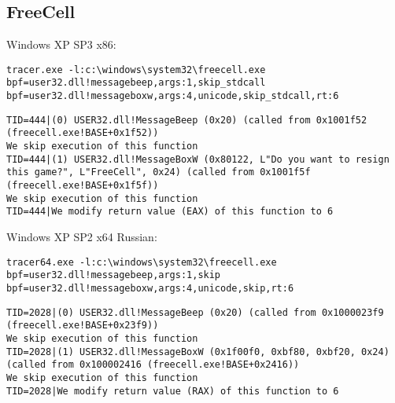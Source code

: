 \subsection{FreeCell}



 Windows XP SP3 x86:

\begin{lstlisting}
tracer.exe -l:c:\windows\system32\freecell.exe bpf=user32.dll!messagebeep,args:1,skip_stdcall bpf=user32.dll!messageboxw,args:4,unicode,skip_stdcall,rt:6
\end{lstlisting}

\begin{lstlisting}
TID=444|(0) USER32.dll!MessageBeep (0x20) (called from 0x1001f52 (freecell.exe!BASE+0x1f52))
We skip execution of this function
TID=444|(1) USER32.dll!MessageBoxW (0x80122, L"Do you want to resign this game?", L"FreeCell", 0x24) (called from 0x1001f5f (freecell.exe!BASE+0x1f5f))
We skip execution of this function
TID=444|We modify return value (EAX) of this function to 6
\end{lstlisting}

 Windows XP SP2 x64 Russian:

\begin{lstlisting}
tracer64.exe -l:c:\windows\system32\freecell.exe bpf=user32.dll!messagebeep,args:1,skip bpf=user32.dll!messageboxw,args:4,unicode,skip,rt:6
\end{lstlisting}

\begin{lstlisting}
TID=2028|(0) USER32.dll!MessageBeep (0x20) (called from 0x1000023f9 (freecell.exe!BASE+0x23f9))
We skip execution of this function
TID=2028|(1) USER32.dll!MessageBoxW (0x1f00f0, 0xbf80, 0xbf20, 0x24) (called from 0x100002416 (freecell.exe!BASE+0x2416))
We skip execution of this function
TID=2028|We modify return value (RAX) of this function to 6
\end{lstlisting}

